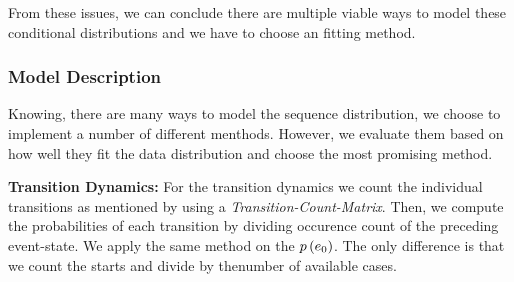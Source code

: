 \documentclass[./../../paper.tex]{subfiles}
\begin{document}
From these issues, we can conclude there are multiple viable ways to model these conditional distributions and we have to choose an fitting method\footnotemark. 

\subsubsection{Model Description}
Knowing, there are many ways to model the sequence distribution, we choose to implement a number of different menthods. However, we evaluate them based on how well they fit the data distribution and choose the most promising method.

\noindent\textbf{Transition Dynamics:} For the transition dynamics we count the individual transitions as mentioned by using a \emph{Transition-Count-Matrix}. Then, we compute the probabilities of each transition by dividing occurence count of the preceding event-state. We apply the same method on the $p\left(e_0\right)$. The only difference is that we count the starts and divide by thenumber of available cases.
\end{document}
